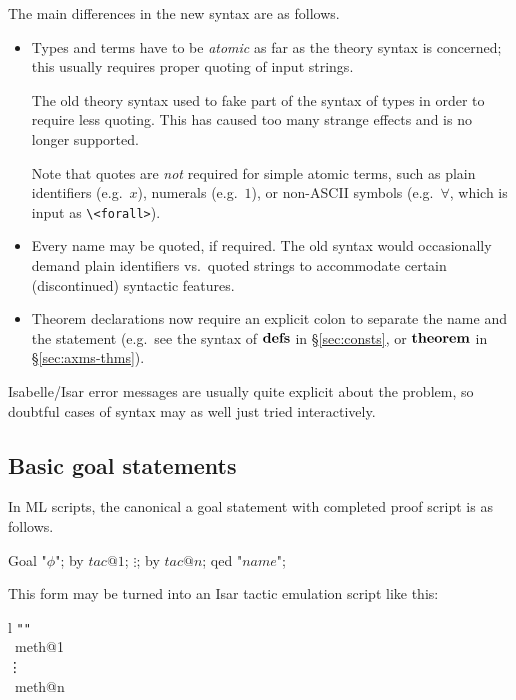 \medskip The main differences in the new syntax are as follows.
\begin{itemize}
\item Types and terms have to be \emph{atomic} as far as the theory syntax is
  concerned; this usually requires proper quoting of input strings.
  
  The old theory syntax used to fake part of the syntax of types in order to
  require less quoting.  This has caused too many strange effects and is no
  longer supported.
  
  Note that quotes are \emph{not} required for simple atomic terms, such as
  plain identifiers (e.g.\ $x$), numerals (e.g.\ $1$), or non-ASCII symbols
  (e.g.\ $\forall$, which is input as \verb,\<forall>,).
\item Every name may be quoted, if required.  The old syntax would
  occasionally demand plain identifiers vs.\ quoted strings to accommodate
  certain (discontinued) syntactic features.
\item Theorem declarations now require an explicit colon to separate the name
  and the statement (e.g.\ see the syntax of ${\mathord{\mathbf{defs}}}$ in \S\ref{sec:consts}, or
  ${\mathord{\mathbf{theorem}}}$ in \S\ref{sec:axms-thms}).
\end{itemize}

Isabelle/Isar error messages are usually quite explicit about the problem, so
doubtful cases of syntax may as well just tried interactively.


\subsection{Basic goal statements}\label{sec:conv-goal}

In ML scripts, the canonical a goal statement with completed proof script is
as follows.
\begin{ttbox}
Goal "\(\phi\)";
  by \(tac@1\);
  \(\vdots\);
  by \(tac@n\);
qed "\(name\)";
\end{ttbox}

This form may be turned into an Isar tactic emulation script like this:
\begin{matharray}{l}
\texttt"{\phi}\texttt" \\
\quad {}~meth@1 \\
\quad \vdots \\
\quad {}~meth@n \\
\quad {} \\
\end{matharray}

